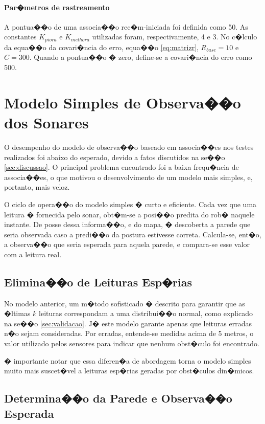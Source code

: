 \paragraph{Par�metros de rastreamento} A pontua��o de uma associa��o rec�m-iniciada foi definida como 50. As constantes $K_{piora}$ e $K_{melhora}$ utilizadas foram, respectivamente, 4 e 3. No c�lculo da equa��o da covari�ncia do erro, equa��o \ref{eq:matrizr}, $R_{base} = 10$ e $C=300$. Quando a pontua��o � zero, define-se a covari�ncia do erro como 500.

\section{Modelo Simples de Observa��o dos Sonares}\label{subsec:modeloSimplesSonar}

O desempenho do modelo de observa��o baseado em associa��es nos testes realizados foi abaixo do esperado, devido a fatos discutidos na se��o \ref{sec:discussao}. O principal problema encontrado foi a baixa frequ�ncia de associa��es, o que motivou o desenvolvimento de um modelo mais simples, e, portanto, mais veloz.

O ciclo de opera��o do modelo simples � curto e eficiente. Cada vez que uma leitura � fornecida pelo sonar, obt�m-se a posi��o predita do rob� naquele instante. De posse dessa informa��o, e do mapa, � descoberta a parede que seria observada caso a predi��o da postura estivesse correta. Calcula-se, ent�o, a observa��o que seria esperada para aquela parede, e compara-se esse valor com a leitura real.

\subsection{Elimina��o de Leituras Esp�rias}

No modelo anterior, um m�todo sofisticado � descrito para garantir que as �ltimas $k$ leituras correspondam a uma distribui��o normal, como explicado na se��o \ref{sec:validacao}. J� este modelo garante apenas que leituras erradas n�o sejam consideradas. Por erradas, entende-se medidas acima de 5 metros, o valor utilizado pelos sensores para indicar que nenhum obst�culo foi encontrado.

� importante notar que essa diferen�a de abordagem torna o modelo simples muito mais suscet�vel a leituras esp�rias geradas por obst�culos din�micos.

\subsection{Determina��o da Parede e Observa��o Esperada}

